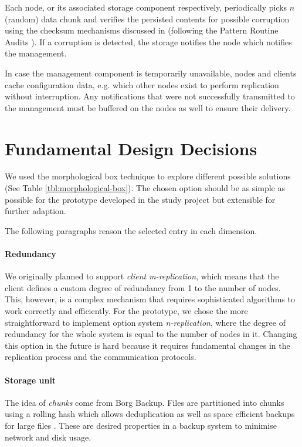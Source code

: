 Each \gls{node}, or its associated \gls{storage} component respectively, periodically picks $n$ (random) data \gls{chunk} and verifies the persisted contents for possible corruption using the checksum mechanisms discussed in  (following the Pattern Routine Audits \cite{fault-tolerance}). If a corruption is detected, the \gls{storage} notifies the \gls{node} which notifies the \gls{management}.

In case the \gls{management} component is temporarily unavailable, \glspl{node} and \glspl{client} cache configuration data, e.g. which other \glspl{node} exist to perform replication without interruption. Any notifications that were not successfully transmitted to the \gls{management} must be buffered on the \glspl{node} as well to ensure their delivery.

\section{Fundamental Design Decisions}\label{sec:fundamental-design-decisions}

We used the morphological box technique to explore different possible solutions (See Table \ref{tbl:morphological-box}). The chosen option should be as simple as possible for the prototype developed in the study project but extensible for further adaption.

The following paragraphs reason the selected entry in each dimension.

\paragraph{Redundancy}
We originally planned to support \emph{client m-replication}, which means that the client defines a custom degree of redundancy from 1 to the number of nodes. This, however, is a complex mechanism that requires sophisticated algorithms to work correctly and efficiently. For the prototype, we chose the more straightforward to implement option system \emph{n-replication}, where the degree of redundancy for the whole system is equal to the number of nodes in it. Changing this option in the future is hard because it requires fundamental changes in the replication process and the communication protocols.

\paragraph{Storage unit}
The idea of \emph{chunks} come from Borg Backup. Files are partitioned into chunks using a rolling hash which allows deduplication as well as space efficient backups for large files \cite{borg-data-structures}. These are desired properties in a backup system to minimise network and disk usage.

